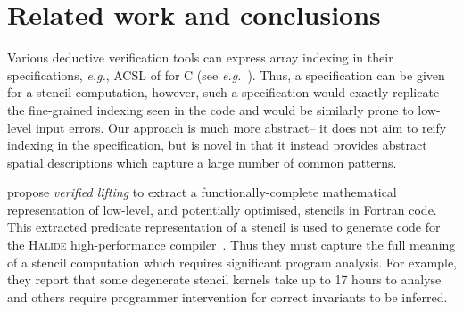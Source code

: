 \documentclass[10pt,preprint,numbers]{sigplanconf}
\theoremstyle{definition}
\newcommand{\eg}{\emph{e.g.}}
\begin{document}

















\section{Related work and conclusions}
\label{sec:discussion}

Various deductive verification tools can express array indexing
in their specifications, \eg{}, ACSL of \citet{baudin2008acsl}
for C (see \eg{}~\citet[Example 3.4.1]{burghardt2010acsl}). Thus, a specification
can be given for a stencil computation, 
however, such a specification would exactly replicate the fine-grained
indexing seen in the code and would be similarly prone to low-level input
errors. Our approach is much more abstract-- it does
not aim to reify indexing in the specification, but is novel
in that it instead
provides abstract spatial descriptions which capture a large number
of common patterns.

\citet{kamil2016verified} propose \emph{verified lifting} to extract a
functionally-complete mathematical representation of low-level, and
potentially optimised, stencils in Fortran code. This extracted
predicate representation of a stencil is used to generate code
for the \textsc{Halide} high-performance
compiler~\citep{ragan2013halide}. Thus they must capture the
full meaning of a stencil computation which requires significant
program analysis. For example, they report that some degenerate
stencil kernels take up to 17 hours to analyse and others require
programmer intervention for correct invariants to be inferred.
\end{document}
